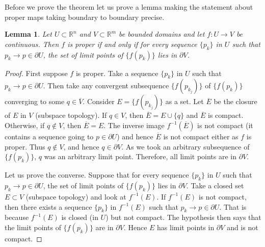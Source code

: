 \documentclass[12pt,openany]{book}
\newcommand{\R}{{\mathbb{R}}}
\theoremstyle{plain}
\newtheorem{lemma}[thm]{Lemma}
\theoremstyle{remark}
\theoremstyle{definition}
\theoremstyle{exercise}
\theoremstyle{example}
\begin{document}
Before we prove the theorem let us prove a lemma making the statement about
proper maps taking boundary to boundary precise.

\begin{lemma} \label{lemma:bndrytobndry}
Let $U \subset \R^n$ and $V \subset \R^m$ be bounded domains and
let $f \colon U \to V$ be continuous.
Then $f$ is proper if and only if
for every sequence $\{ p_k \}$ in $U$ such that $p_k \to p \in \partial U$,
the set of limit points of $\bigl\{ f(p_k) \bigr\}$ lies in $\partial V$.
\end{lemma}

\begin{proof}
First suppose $f$ is proper.  Take a 
sequence $\{ p_k \}$ in $U$ such that $p_k \to p \in \partial U$.
Then take any convergent subsequence $\bigl\{ f(p_{k_j}) \bigr\}$ of
$\bigl\{ f(p_k) \bigr\}$
converging to some $q \in \overline{V}$.  Consider
$E = \bigl\{ f(p_{k_j}) \bigr\}$ as a set.  Let $\overline{E}$ be the closure of $E$
in $V$ (subspace topology).  If $q \in V$, then $\overline{E} = E \cup \{ q
\}$ and $\overline{E}$ is compact.
Otherwise, if $q \notin V$, then
$\overline{E} = E$.
The inverse image $f^{-1}(\overline{E})$
is not compact (it contains a sequence going to $p \in \partial U$)
and hence $\overline{E}$ is not
compact either as $f$ is proper.  Thus $q \notin V$, and hence $q \in
\partial V$.  As we took an arbitrary subsequence of $\bigl\{ f(p_k) \bigr\}$, $q$ was
an arbitrary limit point.  Therefore, all limit points are in $\partial V$.

Let us prove the converse.
Suppose that for every sequence
$\{ p_k \}$ in $U$ such that $p_k \to p \in \partial U$,
the set of limit points of $\bigl\{ f(p_k) \bigr\}$ lies in $\partial V$.
Take a closed set $E \subset V$ (subspace topology) and look at $f^{-1}(E)$.  If $f^{-1}(E)$
is not compact, then there exists a sequence $\{ p_k \}$ in $f^{-1}(E)$
such that $p_k \to p \in \partial U$.  That is because $f^{-1}(E)$ is closed
(in $U$) but not compact.  The hypothesis then says that the limit points of
$\bigl\{ f(p_k) \bigr\}$ are in $\partial V$.  Hence $E$ has limit points in
$\partial V$ and is not compact.
\end{proof}
\end{document}
